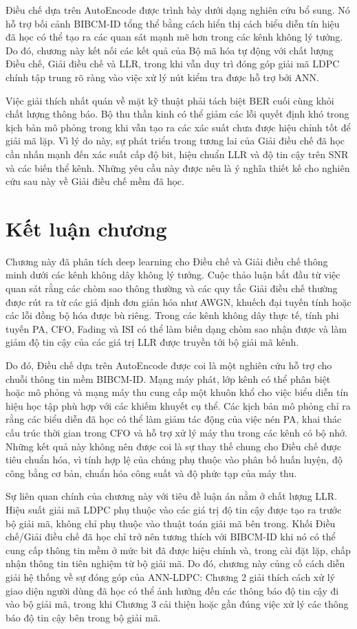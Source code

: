 Điều chế dựa trên AutoEncode được trình bày dưới dạng nghiên cứu bổ sung. Nó hỗ trợ bối cảnh BIBCM-ID tổng thể bằng cách hiển thị cách biểu diễn tín hiệu đã học có thể tạo ra các quan sát mạnh mẽ hơn trong các kênh không lý tưởng. Do đó, chương này kết nối các kết quả của Bộ mã hóa tự động với chất lượng Điều chế, Giải điều chế và LLR, trong khi vẫn duy trì đóng góp giải mã LDPC chính tập trung rõ ràng vào việc xử lý nút kiểm tra được hỗ trợ bởi ANN.

Việc giải thích nhất quán về mặt kỹ thuật phải tách biệt BER cuối cùng khỏi chất lượng thông báo. Bộ thu thần kinh có thể giảm các lỗi quyết định khó trong kịch bản mô phỏng trong khi vẫn tạo ra các xác suất chưa được hiệu chỉnh tốt để giải mã lặp. Vì lý do này, sự phát triển trong tương lai của Giải điều chế đã học cần nhấn mạnh đến xác suất cấp độ bit, hiệu chuẩn LLR và độ tin cậy trên SNR và các biến thể kênh. Những yêu cầu này được nêu là ý nghĩa thiết kế cho nghiên cứu sau này về Giải điều chế mềm đã học.

\section{Kết luận chương}
Chương này đã phân tích deep learning cho Điều chế và Giải điều chế thông minh dưới các kênh không dây không lý tưởng. Cuộc thảo luận bắt đầu từ việc quan sát rằng các chòm sao thông thường và các quy tắc Giải điều chế thường được rút ra từ các giả định đơn giản hóa như AWGN, khuếch đại tuyến tính hoặc các lỗi đồng bộ hóa được bù riêng. Trong các kênh không dây thực tế, tính phi tuyến PA, CFO, Fading và ISI có thể làm biến dạng chòm sao nhận được và làm giảm độ tin cậy của các giá trị LLR được truyền tới bộ giải mã kênh.

Do đó, Điều chế dựa trên AutoEncode được coi là một nghiên cứu hỗ trợ cho chuỗi thông tin mềm BIBCM-ID. Mạng máy phát, lớp kênh có thể phân biệt hoặc mô phỏng và mạng máy thu cung cấp một khuôn khổ cho việc biểu diễn tín hiệu học tập phù hợp với các khiếm khuyết cụ thể. Các kịch bản mô phỏng chỉ ra rằng các biểu diễn đã học có thể làm giảm tác động của việc nén PA, khai thác cấu trúc thời gian trong CFO và hỗ trợ xử lý máy thu trong các kênh có bộ nhớ. Những kết quả này không nên được coi là sự thay thế chung cho Điều chế được tiêu chuẩn hóa, vì tính hợp lệ của chúng phụ thuộc vào phân bố huấn luyện, độ công bằng cơ bản, chuẩn hóa công suất và độ phức tạp của máy thu.

Sự liên quan chính của chương này với tiêu đề luận án nằm ở chất lượng LLR. Hiệu suất giải mã LDPC phụ thuộc vào các giá trị độ tin cậy được tạo ra trước bộ giải mã, không chỉ phụ thuộc vào thuật toán giải mã bên trong. Khối Điều chế/Giải điều chế đã học chỉ trở nên tương thích với BIBCM-ID khi nó có thể cung cấp thông tin mềm ở mức bit đã được hiệu chỉnh và, trong cài đặt lặp, chấp nhận thông tin tiên nghiệm từ bộ giải mã. Do đó, chương này củng cố cách diễn giải hệ thống về sự đóng góp của ANN-LDPC: Chương 2 giải thích cách xử lý giao diện người dùng đã học có thể ảnh hưởng đến các thông báo độ tin cậy đi vào bộ giải mã, trong khi Chương 3 cải thiện hoặc gần đúng việc xử lý các thông báo độ tin cậy bên trong bộ giải mã.

